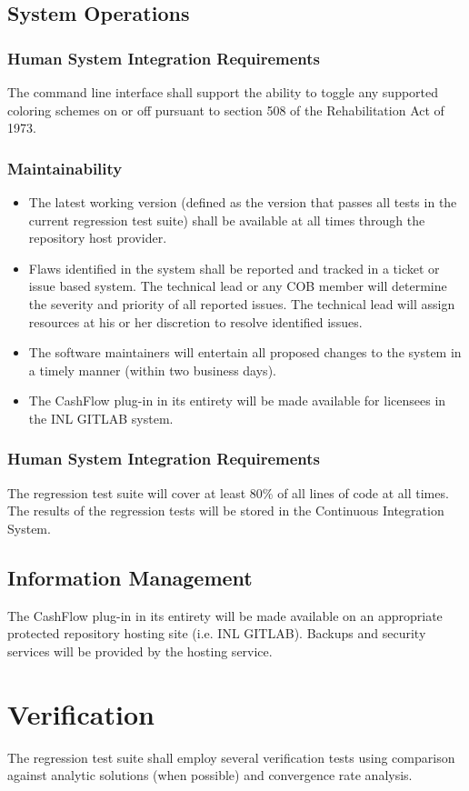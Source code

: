 \subsection{System Operations}
\subsubsection{Human System Integration Requirements}
The command line interface shall support the ability to toggle any supported coloring schemes on or off pursuant to section 
508 of the Rehabilitation Act of 1973.
\subsubsection{Maintainability}
\begin{itemize}
  \item The latest working version (defined as the version that passes all tests in the current regression test suite) shall be 
            available at all times through the repository host provider.
  \item  Flaws identified in the system shall be reported and tracked in a ticket or issue based system. The technical lead or 
            any COB member will 
            determine the severity and priority of all reported issues. The technical lead will assign resources at his or her 
            discretion to resolve identified issues.
  \item  The software maintainers will entertain all proposed changes to the system in a timely manner 
           (within two business days).        
%
%
  \item  The CashFlow plug-in in its entirety will be made available for licensees in the INL GITLAB system.    
\end{itemize}
\subsubsection{Human System Integration Requirements}
The regression test suite will cover at least 80\% of all lines of code at all times. 
The results of the regression tests will be stored in the Continuous Integration System.

\subsection{Information Management}
%
%
The CashFlow plug-in in its entirety will be made available on an appropriate protected repository hosting site (i.e. INL GITLAB).
Backups and security services will be provided by the hosting service.

\section{Verification}
The regression test suite shall employ several verification tests using comparison against analytic 
solutions (when possible) and convergence rate analysis. 